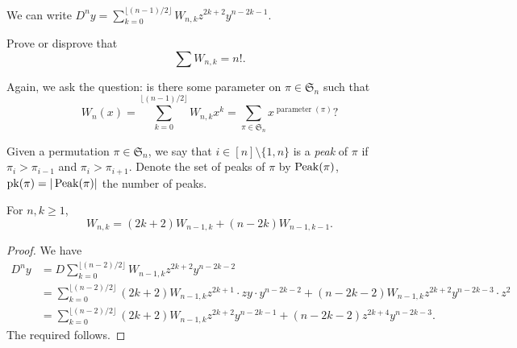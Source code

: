 	\begin{fcor}
		We can write $D^ny = \sum_{k=0}^{\lfloor (n-1)/2 \rfloor} W_{n,k} z^{2k+2} y^{n-2k-1}$.
	\end{fcor}

	\begin{exercise}
		Prove or disprove that
		\[ \sum W_{n,k} = n!. \]
	\end{exercise}
	Again, we ask the question: is there some parameter on $\pi \in \mathfrak{S}_n$ such that
	\[ W_n(x) = \sum_{k = 0}^{\lfloor (n-1)/2 \rfloor} W_{n,k} x^k = \sum_{\pi \in \mathfrak{S}_n} x^{\operatorname{parameter}(\pi)}? \]

	\begin{fdef}[Peak]
		Given a permutation $\pi \in \mathfrak{S}_n$, we say that $i \in [n] \setminus \{1,n\}$ is a \emph{peak} of $\pi$ if $\pi_i > \pi_{i-1}$ and $\pi_i > \pi_{i+1}$. Denote the set of peaks of $\pi$ by $\operatorname{Peak}(\pi)$, $\operatorname{pk}(\pi) = |\operatorname{Peak}(\pi)|$ the number of peaks.
	\end{fdef}

	\begin{lemma}
		\label{lem: Wnk recurrence}
		For $n,k \ge 1$,
		\[ W_{n,k} = (2k+2) W_{n-1,k} + (n-2k) W_{n-1,k-1}. \]
	\end{lemma}
	\begin{proof}
		We have
		\begin{align*}
			D^{n}y &= D \sum_{k=0}^{\lfloor (n-2)/2 \rfloor} W_{n-1,k} z^{2k+2} y^{n-2k-2} \\
				&= \sum_{k=0}^{\lfloor (n-2)/2 \rfloor} (2k+2) W_{n-1,k} z^{2k+1} \cdot zy \cdot y^{n-2k-2} + (n-2k-2) W_{n-1,k} z^{2k+2} y^{n-2k-3} \cdot z^2 \\
				&= \sum_{k=0}^{\lfloor (n-2)/2 \rfloor} (2k+2) W_{n-1,k} z^{2k+2} y^{n-2k-1} + (n-2k-2) z^{2k+4} y^{n-2k-3}.
		\end{align*}
		The required follows.
	\end{proof}

